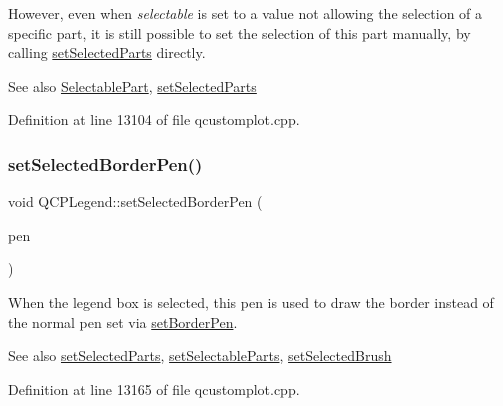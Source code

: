 However, even when {\itshape selectable} is set to a value not allowing the selection of a specific part, it is still possible to set the selection of this part manually, by calling \hyperlink{class_q_c_p_legend_a2aee309bb5c2a794b1987f3fc97f8ad8}{set\+Selected\+Parts} directly.

\begin{DoxySeeAlso}{See also}
\hyperlink{class_q_c_p_legend_a5404de8bc1e4a994ca4ae69e2c7072f1}{Selectable\+Part}, \hyperlink{class_q_c_p_legend_a2aee309bb5c2a794b1987f3fc97f8ad8}{set\+Selected\+Parts} 
\end{DoxySeeAlso}


Definition at line 13104 of file qcustomplot.\+cpp.

\mbox{\label{class_q_c_p_legend_a2c35d262953a25d96b6112653fbefc88}} 
\subsubsection{\texorpdfstring{set\+Selected\+Border\+Pen()}{setSelectedBorderPen()}}
{\footnotesize\ttfamily void Q\+C\+P\+Legend\+::set\+Selected\+Border\+Pen (\begin{DoxyParamCaption}\item[{const Q\+Pen \&}]{pen }\end{DoxyParamCaption})}

When the legend box is selected, this pen is used to draw the border instead of the normal pen set via \hyperlink{class_q_c_p_legend_a866a9e3f5267de7430a6c7f26a61db9f}{set\+Border\+Pen}.

\begin{DoxySeeAlso}{See also}
\hyperlink{class_q_c_p_legend_a2aee309bb5c2a794b1987f3fc97f8ad8}{set\+Selected\+Parts}, \hyperlink{class_q_c_p_legend_a9ce60aa8bbd89f62ae4fa83ac6c60110}{set\+Selectable\+Parts}, \hyperlink{class_q_c_p_legend_a875227f3219c9799464631dec5e8f1bd}{set\+Selected\+Brush} 
\end{DoxySeeAlso}


Definition at line 13165 of file qcustomplot.\+cpp.

\mbox{\label{class_q_c_p_legend_a875227f3219c9799464631dec5e8f1bd}} 
